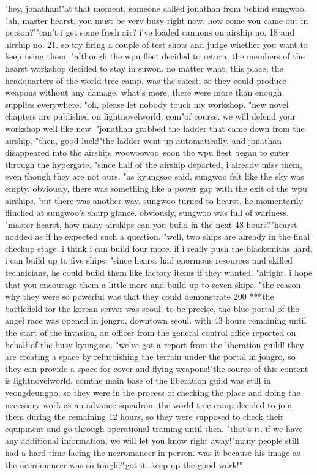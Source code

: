 "hey, jonathan!"at that moment, someone called jonathan from behind sungwoo.
"ah, master hearst, you must be very busy right now.
 how come you came out in person?'"can't i get some fresh air? i've loaded cannons on airship no.
 18 and airship no.
 21.
 so try firing a couple of test shots and judge whether you want to keep using them.
"although the wpu fleet decided to return, the members of the hearst workshop decided to stay in suwon.
 no matter what, this place, the headquarters of the world tree camp, was the safest, so they could produce weapons without any damage.
 what's more, there were more than enough supplies everywhere.
"oh, please let nobody touch my workshop.
"new novel chapters are published on lightnov‌elworld.
c­om"of course.
 we will defend your workshop well like new.
"jonathan grabbed the ladder that came down from the airship.
"then, good luck!"the ladder went up automatically, and jonathan disappeared into the airship.
woowoowoo~soon the wpu fleet began to enter through the hypergate.
"since half of the airship departed, i already miss them, even though they are not ours.
"as kyungsoo said, sungwoo felt like the sky was empty.
 obviously, there was something like a power gap with the exit of the wpu airships.
but there was another way.
 sungwoo turned to hearst.
 he momentarily flinched at sungwoo's sharp glance.
 obviously, sungwoo was full of wariness.
"master hearst, how many airships can you build in the next 48 hours?"hearst nodded as if he expected such a question.
"well, two ships are already in the final checkup stage.
 i think i can build four more.
 if i really push the blacksmiths hard, i can build up to five ships.
"since hearst had enormous resources and skilled technicians, he could build them like factory items if they wanted.
"alright.
 i hope that you encourage them a little more and build up to seven ships.
"the reason why they were so powerful was that they could demonstrate 200%
***the battlefield for the korean server was seoul.
 to be precise, the blue portal of the angel race was opened in jongro, downtown seoul.
with 43 hours remaining until the start of the invasion, an officer from the general control office reported on behalf of the busy kyungsoo.
"we've got a report from the liberation guild! they are creating a space by refurbishing the terrain under the portal in jongro, so they can provide a space for cover and flying weapons!"the source of this content is lightnovelworld.
comthe main base of the liberation guild was still in yeongdeungpo, so they were in the process of checking the place and doing the necessary work as an advance squadron.
the world tree camp decided to join them during the remaining 12 hours, so they were supposed to check their equipment and go through operational training until then.
"that's it.
 if we have any additional information, we will let you know right away!"many people still had a hard time facing the necromancer in person.
 was it because his image as the necromancer was so tough?"got it.
 keep up the good work!"

